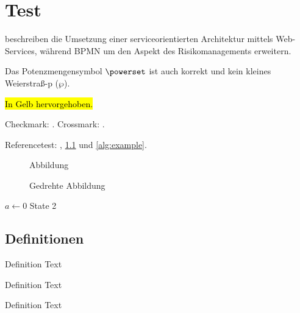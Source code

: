 
\chapter{Test}
\label{chap:test}

 beschreiben die Umsetzung einer serviceorientierten Architektur mittels Web-Services, während \citet{zMR2005} BPMN um den Aspekt des Risikomanagements erweitern.



Das Potenzmengensymbol $\powerset$ ist auch korrekt und kein kleines Weierstraß-p ($\wp$).


\hl{In Gelb hervorgehoben.}

Checkmark: \dingcheck. Crossmark: \dingcross.

Referencetest: , \cref{fig:Abbildung} und \cref{alg:example}.

\begin{figure}
\missingfigure{}
\caption{Abbildung}
\label{fig:Abbildung}
\end{figure}

\begin{landscape}
\begin{figure}
\missingfigure{}
\caption{Gedrehte Abbildung}
\label{fig:AbbildungGedreht}
\end{figure}
\end{landscape}

\begin{algorithm}
\caption{$algo$}
\label{alg:example}
\begin{algorithmic}[1]
\State $a \gets 0$
\State State 2\label{alg1:state2}
\end{algorithmic}
\end{algorithm}

\section{Definitionen}
\begin{definition}[Title]
\label{def:def1}
Definition Text
\end{definition}

\begin{definition}[Title]
\label{def:def1}
Definition Text
\end{definition}

\begin{definition}[Title]
\label{def:def1}
Definition Text
\end{definition}

